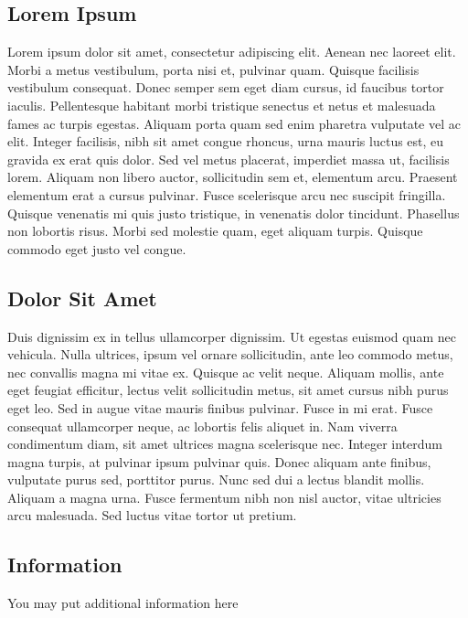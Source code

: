 \documentclass[a4paper,10pt]{article}
\begin{document}
\begin{multicols}{2}


\section{Lorem Ipsum}

Lorem ipsum dolor sit amet, consectetur adipiscing elit. \cite[p. 1]{myarticle} Aenean nec laoreet elit. Morbi a metus vestibulum, porta nisi et, pulvinar quam. Quisque facilisis vestibulum consequat. Donec semper sem eget diam cursus, id faucibus tortor iaculis. Pellentesque habitant morbi tristique senectus et netus et malesuada fames ac turpis egestas. Aliquam porta quam sed enim pharetra vulputate vel ac elit. Integer facilisis, nibh sit amet congue rhoncus, urna mauris luctus est, eu gravida ex erat quis dolor. Sed vel metus placerat, imperdiet massa ut, facilisis lorem. Aliquam non libero auctor, sollicitudin sem et, elementum arcu. Praesent elementum erat a cursus pulvinar. Fusce scelerisque arcu nec suscipit fringilla. Quisque venenatis mi quis justo tristique, in venenatis dolor tincidunt. Phasellus non lobortis risus. Morbi sed molestie quam, eget aliquam turpis. Quisque commodo eget justo vel congue.

\subsection{Dolor Sit Amet}
Duis dignissim ex in tellus ullamcorper dignissim. Ut egestas euismod quam nec vehicula. Nulla ultrices, ipsum vel ornare sollicitudin, ante leo commodo metus, nec convallis magna mi vitae ex. Quisque ac velit neque. Aliquam mollis, ante eget feugiat efficitur, lectus velit sollicitudin metus, sit amet cursus nibh purus eget leo. Sed in augue vitae mauris finibus pulvinar. Fusce in mi erat. Fusce consequat ullamcorper neque, ac lobortis felis aliquet in. Nam viverra condimentum diam, sit amet ultrices magna scelerisque nec. Integer interdum magna turpis, at pulvinar ipsum pulvinar quis. Donec aliquam ante finibus, vulputate purus sed, porttitor purus. Nunc sed dui a lectus blandit mollis. Aliquam a magna urna. Fusce fermentum nibh non nisl auctor, vitae ultricies arcu malesuada. Sed luctus vitae tortor ut pretium. 


\end{multicols}

\nocite{*} %
\printbibliography

\newpage

\begin{appendices}
    \section{Information}
    You may put additional information here
\end{appendices}
\end{document}
